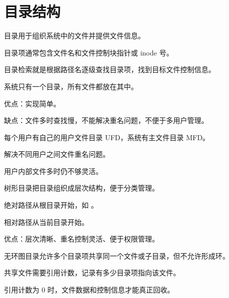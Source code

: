 \section{目录结构}
\begin{points}
  \item 目录用于组织系统中的文件并提供文件信息。
  \item 目录项通常包含文件名和文件控制块指针或 inode 号。
  \item 目录检索就是根据路径名逐级查找目录项，找到目标文件控制信息。
\end{points}


\begin{points}
  \item 系统只有一个目录，所有文件都放在其中。
  \item 优点：实现简单。
  \item 缺点：文件多时查找慢，不能解决重名问题，不便于多用户管理。
\end{points}


\begin{points}
  \item 每个用户有自己的用户文件目录 UFD，系统有主文件目录 MFD。
  \item 解决不同用户之间文件重名问题。
  \item 用户内部文件多时仍不够灵活。
\end{points}


\begin{points}
  \item 树形目录把目录组织成层次结构，便于分类管理。
  \item 绝对路径从根目录开始，如 。
  \item 相对路径从当前目录开始。
  \item 优点：层次清晰、重名控制灵活、便于权限管理。
\end{points}


\begin{points}
  \item 无环图目录允许多个目录项共享同一个文件或子目录，但不允许形成环。
  \item 共享文件需要引用计数，记录有多少目录项指向该文件。
  \item 引用计数为 0 时，文件数据和控制信息才能真正回收。
\end{points}



